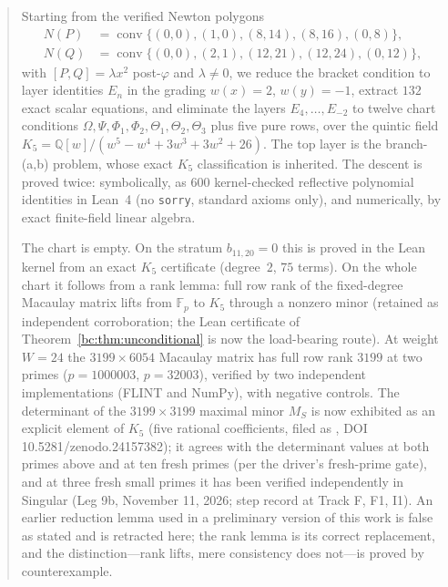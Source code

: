 \documentclass[a4paper,11pt]{article}
\newcommand{\filename}[1]{\texttt{\seqsplit{#1}}}
\theoremstyle{plain}
\theoremstyle{definition}
\theoremstyle{remark}
\begin{document}
\begin{abstract}
Starting from the verified Newton polygons
\[
\begin{aligned}
N(P)&=\operatorname{conv}\{(0,0),(1,0),(8,14),(8,16),(0,8)\},\\
N(Q)&=\operatorname{conv}\{(0,0),(2,1),(12,21),(12,24),(0,12)\},
\end{aligned}
\]
with $[P,Q]=\lambda x^2$ post-$\varphi$ and $\lambda\ne0$, we reduce the bracket condition to layer identities $E_n$ in the grading $w(x)=2$, $w(y)=-1$, extract $132$ exact scalar equations, and eliminate the layers $E_4,\dots,E_{-2}$ to twelve chart conditions $\Omega,\Psi,\Phi_1,\Phi_2,\Theta_1,\Theta_2,\Theta_3$ plus five pure rows, over the quintic field $K_5=\mathbb{Q}[w]/(w^5-w^4+3w^3+3w^2+26)$. The top layer is the branch-(a,b) problem, whose exact $K_5$ classification is inherited. The descent is proved twice: symbolically, as $600$ kernel-checked reflective polynomial identities in Lean~4 (no \texttt{sorry}, standard axioms only), and numerically, by exact finite-field linear algebra.

The chart is empty. On the stratum $b_{11,20}=0$ this is proved in the Lean kernel from an exact $K_5$ certificate (degree~$2$, $75$ terms). On the whole chart it follows from a rank lemma: full row rank of the fixed-degree Macaulay matrix lifts from $\mathbb{F}_p$ to $K_5$ through a nonzero minor (retained as independent corroboration; the Lean certificate of Theorem~\ref{bc:thm:unconditional} is now the load-bearing route). At weight $W=24$ the $3199\times 6054$ Macaulay matrix has full row rank $3199$ at two primes ($p=1000003$, $p=32003$), verified by two independent implementations (FLINT and NumPy), with negative controls. The determinant of the $3199\times3199$ maximal minor $M_S$ is now exhibited as an explicit element of $K_5$ (five rational coefficients, filed as \filename{gghv-dependency-closure/leg9/result.json}, DOI 10.5281/zenodo.24157382); it agrees with the determinant values at both primes above and at ten fresh primes (per the driver's fresh-prime gate), and at three fresh small primes it has been verified independently in Singular (Leg 9b, November 11, 2026; step record at Track F, F1, I1). An earlier reduction lemma used in a preliminary version of this work is false as stated and is retracted here; the rank lemma is its correct replacement, and the distinction---rank lifts, mere consistency does not---is proved by counterexample.


\end{abstract}
\end{document}
